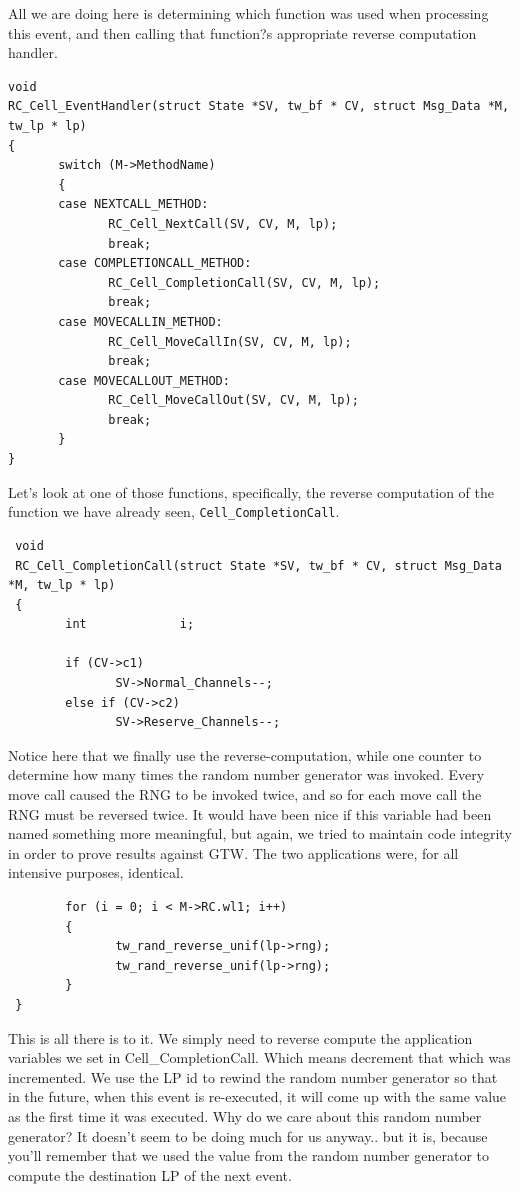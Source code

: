 \documentclass[12pt]{article}
\begin{document}
All we are doing here is determining which function was used when
processing this event, and then calling that function?s appropriate
reverse computation handler.
 
\begin{verbatim}
void
RC_Cell_EventHandler(struct State *SV, tw_bf * CV, struct Msg_Data *M, tw_lp * lp)
{
       switch (M->MethodName)
       {
       case NEXTCALL_METHOD:
              RC_Cell_NextCall(SV, CV, M, lp);
              break;
       case COMPLETIONCALL_METHOD:
              RC_Cell_CompletionCall(SV, CV, M, lp);
              break;
       case MOVECALLIN_METHOD:
              RC_Cell_MoveCallIn(SV, CV, M, lp);
              break;
       case MOVECALLOUT_METHOD:
              RC_Cell_MoveCallOut(SV, CV, M, lp);
              break;
       }
}
\end{verbatim}
 
Let's look at one of those functions, specifically, the reverse
computation of the function we have already seen, {\tt Cell\_CompletionCall}.

\begin{verbatim}
 void
 RC_Cell_CompletionCall(struct State *SV, tw_bf * CV, struct Msg_Data *M, tw_lp * lp)
 {
        int             i;

        if (CV->c1)
               SV->Normal_Channels--;
        else if (CV->c2)
               SV->Reserve_Channels--;
\end{verbatim}
 
Notice here that we finally use the reverse-computation, while one
counter to determine how many times the random number generator was
invoked.  Every move call caused the RNG to be invoked twice, and so
for each move call the RNG must be reversed twice.  It would have been
nice if this variable had been named something more meaningful, but
again, we tried to maintain code integrity in order to prove results
against GTW.  The two applications were, for all intensive purposes,
identical.

\begin{verbatim}
        for (i = 0; i < M->RC.wl1; i++)
        {
               tw_rand_reverse_unif(lp->rng);
               tw_rand_reverse_unif(lp->rng);
        }
 }
\end{verbatim}
 
This is all there is to it.  We simply need to reverse compute the
application variables we set in Cell\_CompletionCall.  Which means
decrement that which was incremented.  We use the LP id to rewind the
random number generator so that in the future, when this event is
re-executed, it will come up with the same value as the first time it
was executed.  Why do we care about this random number generator?  It
doesn't seem to be doing much for us anyway.. but it is, because
you'll remember that we used the value from the random number
generator to compute the destination LP of the next event.
 
\end{document}
